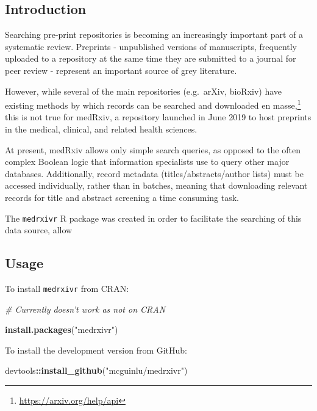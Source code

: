\documentclass[a4paper, nobind]{templates/ociamthesis}
\newenvironment{Shaded}{\begin{snugshade}}{\end{snugshade}}
\newcommand{\CommentTok}[1]{\textcolor[rgb]{0.56,0.35,0.01}{\textit{#1}}}
\newcommand{\KeywordTok}[1]{\textcolor[rgb]{0.13,0.29,0.53}{\textbf{#1}}}
\newcommand{\NormalTok}[1]{#1}
\newcommand{\OperatorTok}[1]{\textcolor[rgb]{0.81,0.36,0.00}{\textbf{#1}}}
\newcommand{\StringTok}[1]{\textcolor[rgb]{0.31,0.60,0.02}{#1}}
\renewenvironment{Shaded}
{
  \vspace{4pt}%
  \begin{snugshade}%
}{%
  \end{snugshade}%
  \vspace{4pt}%
}
\begin{document}
\hypertarget{introduction-1}{%
\subsection{Introduction}\label{introduction-1}}

Searching pre-print repositories is becoming an increasingly important part of a systematic review. Preprints - unpublished versions of manuscripts, frequently uploaded to a repository at the same time they are submitted to a journal for peer review - represent an important source of grey literature.

However, while several of the main repositories (e.g.~arXiv, bioRxiv) have existing methods by which records can be searched and downloaded en masse,\footnote{\url{https://arxiv.org/help/api}} this is not true for medRxiv, a repository launched in June 2019 to host preprints in the medical, clinical, and related health sciences.

At present, medRxiv allows only simple search queries, as opposed to the often complex Boolean logic that information specialists use to query other major databases. Additionally, record metadata (titles/abstracts/author lists) must be accessed individually, rather than in batches, meaning that downloading relevant records for title and abstract screening a time consuming task.

The \texttt{medrxivr} R package was created in order to facilitate the searching of this data source, allow

\hypertarget{usage-1}{%
\subsection{Usage}\label{usage-1}}

To install \texttt{medrxivr} from CRAN:

\begin{Shaded}
\begin{Highlighting}[]
\CommentTok{# Currently doesn't work as not on CRAN}

\KeywordTok{install.packages}\NormalTok{(}\StringTok{"medrxivr"}\NormalTok{)}
\end{Highlighting}
\end{Shaded}

To install the development version from GitHub:

\begin{Shaded}
\begin{Highlighting}[]
\NormalTok{devtools}\OperatorTok{::}\KeywordTok{install_github}\NormalTok{(}\StringTok{"mcguinlu/medrxivr"}\NormalTok{)}
\end{Highlighting}
\end{Shaded}
\end{document}
